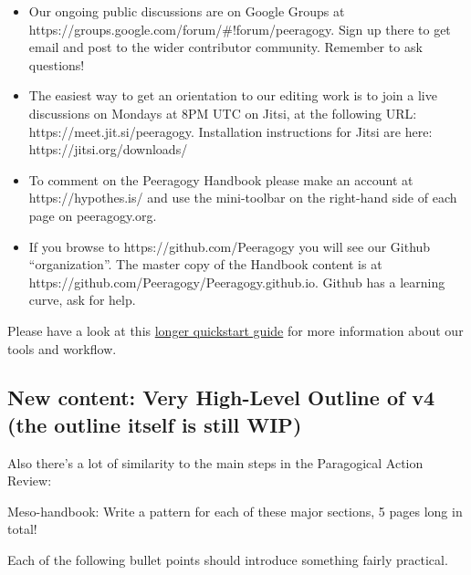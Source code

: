 \begin{itemize}
\tightlist
\item
  Our ongoing public discussions are on Google Groups at
  https://groups.google.com/forum/\#!forum/peeragogy. Sign up there to
  get email and post to the wider contributor community. Remember to ask
  questions!
\item
  The easiest way to get an orientation to our editing work is to join a
  live discussions on Mondays at 8PM UTC on Jitsi, at the following URL:
  https://meet.jit.si/peeragogy. Installation instructions for Jitsi are
  here: https://jitsi.org/downloads/
\item
  To comment on the Peeragogy Handbook please make an account at
  https://hypothes.is/ and use the mini-toolbar on the right-hand side
  of each page on peeragogy.org.
\item
  If you browse to https://github.com/Peeragogy you will see our Github
  ``organization''. The master copy of the Handbook content is at
  https://github.com/Peeragogy/Peeragogy.github.io. Github has a
  learning curve, ask for help.
\end{itemize}

Please have a look at this
\href{https://github.com/Peeragogy/peeragogy-handbook/wiki/Quickstart-guide}{longer
quickstart guide} for more information about our tools and workflow.

\hypertarget{new-content-very-high-level-outline-of-v4-the-outline-itself-is-still-wip}{%
\subsection{New content: Very High-Level Outline of v4 (the outline
itself is still
WIP)}\label{new-content-very-high-level-outline-of-v4-the-outline-itself-is-still-wip}}

Also there's a lot of similarity to the main steps in the Paragogical
Action Review:

Meso-handbook: Write a pattern for each of these major sections, 5 pages
long in total!

Each of the following bullet points should introduce something fairly
practical.

